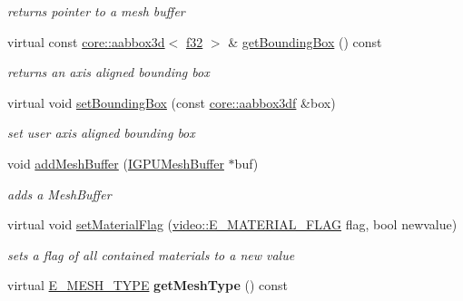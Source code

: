 \begin{DoxyCompactItemize}
\begin{DoxyCompactList}\small\item\em returns pointer to a mesh buffer \end{DoxyCompactList}\item 
virtual const \hyperlink{classirr_1_1core_1_1aabbox3d}{core\+::aabbox3d}$<$ \hyperlink{namespaceirr_a0277be98d67dc26ff93b1a6a1d086b07}{f32} $>$ \& \hyperlink{classirr_1_1scene_1_1SGPUMesh_a19ce317ec8eed0e5051135506c2767b4}{get\+Bounding\+Box} () const \hypertarget{classirr_1_1scene_1_1SGPUMesh_a19ce317ec8eed0e5051135506c2767b4}{}\label{classirr_1_1scene_1_1SGPUMesh_a19ce317ec8eed0e5051135506c2767b4}

\begin{DoxyCompactList}\small\item\em returns an axis aligned bounding box \end{DoxyCompactList}\item 
virtual void \hyperlink{classirr_1_1scene_1_1SGPUMesh_a077ac911871bacb359bdf540de40029f}{set\+Bounding\+Box} (const \hyperlink{namespaceirr_1_1core_adfc8fa01b30044c55f3332a1d6c1aa19}{core\+::aabbox3df} \&box)\hypertarget{classirr_1_1scene_1_1SGPUMesh_a077ac911871bacb359bdf540de40029f}{}\label{classirr_1_1scene_1_1SGPUMesh_a077ac911871bacb359bdf540de40029f}

\begin{DoxyCompactList}\small\item\em set user axis aligned bounding box \end{DoxyCompactList}\item 
void \hyperlink{classirr_1_1scene_1_1SGPUMesh_ab7e290216161f9f45be8a35b0d98a9c8}{add\+Mesh\+Buffer} (\hyperlink{classirr_1_1scene_1_1IGPUMeshBuffer}{I\+G\+P\+U\+Mesh\+Buffer} $\ast$buf)
\begin{DoxyCompactList}\small\item\em adds a Mesh\+Buffer \end{DoxyCompactList}\item 
virtual void \hyperlink{classirr_1_1scene_1_1SGPUMesh_a8cbba306dc9fc44460808ff4c9d925be}{set\+Material\+Flag} (\hyperlink{namespaceirr_1_1video_a8a3bc00ae8137535b9fbc5f40add70d3}{video\+::\+E\+\_\+\+M\+A\+T\+E\+R\+I\+A\+L\+\_\+\+F\+L\+AG} flag, bool newvalue)\hypertarget{classirr_1_1scene_1_1SGPUMesh_a8cbba306dc9fc44460808ff4c9d925be}{}\label{classirr_1_1scene_1_1SGPUMesh_a8cbba306dc9fc44460808ff4c9d925be}

\begin{DoxyCompactList}\small\item\em sets a flag of all contained materials to a new value \end{DoxyCompactList}\item 
virtual \hyperlink{namespaceirr_1_1scene_aef0400177e5941293dff6640e800d11b}{E\+\_\+\+M\+E\+S\+H\+\_\+\+T\+Y\+PE} {\bfseries get\+Mesh\+Type} () const \hypertarget{classirr_1_1scene_1_1SGPUMesh_a7b18db4d5c489c58fadda3f649b045c6}{}\label{classirr_1_1scene_1_1SGPUMesh_a7b18db4d5c489c58fadda3f649b045c6}

\end{DoxyCompactItemize}
